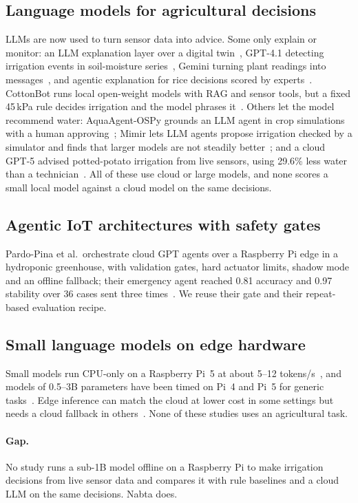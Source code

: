 \documentclass[10pt,twocolumn]{article}
\begin{document}
\subsection{Language models for agricultural decisions}
LLMs are now used to turn sensor data into advice. Some only explain or monitor: an LLM explanation layer over a digital twin~\cite{ZHA24}, GPT-4.1 detecting irrigation events in soil-moisture series~\cite{LEE25}, Gemini turning plant readings into messages~\cite{AGA24}, and agentic explanation for rice decisions scored by experts~\cite{YAM25}. CottonBot runs local open-weight models with RAG and sensor tools, but a fixed 45\,kPa rule decides irrigation and the model phrases it~\cite{KAN25}. Others let the model recommend water: AquaAgent-OSPy grounds an LLM agent in crop simulations with a human approving~\cite{PARK26}; Mimir lets LLM agents propose irrigation checked by a simulator and finds that larger models are not steadily better~\cite{MIM26}; and a cloud GPT-5 advised potted-potato irrigation from live sensors, using 29.6\% less water than a technician~\cite{ELA26}. All of these use cloud or large models, and none scores a small local model against a cloud model on the same decisions.

\subsection{Agentic IoT architectures with safety gates}
Pardo-Pina et al.\ orchestrate cloud GPT agents over a Raspberry Pi edge in a hydroponic greenhouse, with validation gates, hard actuator limits, shadow mode and an offline fallback; their emergency agent reached 0.81 accuracy and 0.97 stability over 36 cases sent three times~\cite{PAR26}. We reuse their gate and their repeat-based evaluation recipe.

\subsection{Small language models on edge hardware}
Small models run CPU-only on a Raspberry Pi~5 at about 5--12 tokens/s~\cite{NEZ24,STRAT}, and models of 0.5--3B parameters have been timed on Pi~4 and Pi~5 for generic tasks~\cite{LEAF26}. Edge inference can match the cloud at lower cost in some settings but needs a cloud fallback in others~\cite{JAN25}. None of these studies uses an agricultural task.

\paragraph{Gap.} No study runs a sub-1B model offline on a Raspberry Pi to make irrigation decisions from live sensor data and compares it with rule baselines and a cloud LLM on the same decisions. Nabta does.
\end{document}
